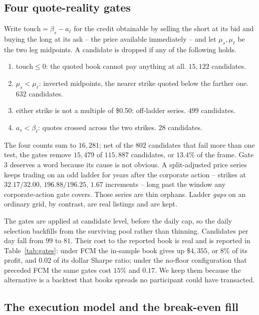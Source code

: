 \documentclass[11pt]{article}
\begin{document}
\subsection{Four quote-reality gates}
\label{sec:qualitygates}

Write $\mathrm{touch} = \beta_s - a_\ell$ for the credit obtainable by selling
the short at its bid and buying the long at its ask -- the price available
immediately -- and let $\mu_s, \mu_\ell$ be the two leg midpoints. A candidate
is dropped if any of the following holds.

\begin{enumerate}
\item $\mathrm{touch} \leq 0$: the quoted book cannot pay anything at all.
      $15{,}122$ candidates.
\item $\mu_s < \mu_\ell$: inverted midpoints, the nearer strike quoted below
      the farther one. $632$ candidates.
\item either strike is not a multiple of \$0.50: off-ladder series.
      $499$ candidates.
\item $a_s < \beta_\ell$: quotes crossed across the two strikes.
      $28$ candidates.
\end{enumerate}

The four counts sum to $16{,}281$; net of the $802$ candidates that fail more
than one test, the gates remove $15{,}479$ of $115{,}887$ candidates, or
$13.4\%$ of the frame. Gate 3 deserves a
word because its cause is not obvious. A split-adjusted price series keeps
trading on an odd ladder for years after the corporate action -- strikes at
$32.17/32.00$, $196.88/196.25$, $1.67$ increments -- long past the window any
corporate-action gate covers. Those series are thin orphans. Ladder \emph{gaps}
on an ordinary grid, by contrast, are real listings and are kept.

The gates are applied at candidate level, before the daily cap, so the daily
selection backfills from the surviving pool rather than thinning. Candidates
per day fall from $99$ to $81$. Their cost to the reported book is real and is
reported in Table~\ref{tab:gates}: under FCM the in-sample book gives up
$\$4{,}355$, or $8\%$ of its profit, and $0.02$ of its dollar Sharpe ratio;
under the no-floor configuration that preceded FCM the same gates cost $15\%$
and $0.17$. We keep them because the alternative is a backtest that books
spreads no participant could have transacted.

\subsection{The execution model and the break-even fill}
\label{sec:execution}
\end{document}
